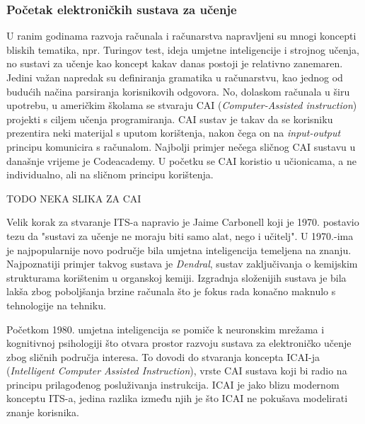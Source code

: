 \documentclass[times, utf8, zavrsni]{fer}
\begin{document}
\subsubsection{Početak elektroničkih sustava za učenje}
U ranim godinama razvoja računala i računarstva napravljeni su mnogi koncepti bliskih tematika, npr. Turingov test, ideja umjetne inteligencije i strojnog učenja, no sustavi za učenje kao koncept kakav danas postoji je relativno zanemaren. Jedini važan napredak su definiranja gramatika u računarstvu, kao jednog od budućih načina parsiranja korisnikovih odgovora. No, dolaskom računala u širu upotrebu, u američkim školama se stvaraju CAI (\textit{Computer-Assisted instruction}) projekti s ciljem učenja programiranja. CAI sustav je takav da se korisniku prezentira neki materijal s uputom korištenja, nakon čega on na \textit{input-output} principu komunicira s računalom. Najbolji primjer nečega sličnog CAI sustavu u današnje vrijeme je Codeacademy. U početku se CAI koristio u učionicama, a ne individualno, ali na sličnom principu korištenja.
\par TODO NEKA SLIKA ZA CAI
\par
Velik korak za stvaranje ITS-a napravio je Jaime Carbonell koji je 1970. postavio tezu da "sustavi za učenje ne moraju biti samo alat, nego i učitelj". U 1970.-ima je najpopularnije novo područje bila umjetna inteligencija temeljena na znanju. Najpoznatiji primjer takvog sustava je \textit{Dendral}, sustav zaključivanja o kemijskim strukturama korištenim u organskoj kemiji. Izgradnja složenijih sustava je bila lakša zbog poboljšanja brzine računala što je fokus rada konačno maknulo s tehnologije na tehniku. 
\par
Početkom 1980. umjetna inteligencija se pomiče k neuronskim mrežama i kognitivnoj psihologiji što otvara prostor razvoju sustava za elektroničko učenje zbog sličnih područja interesa. To dovodi do stvaranja koncepta ICAI-ja (\textit{Intelligent Computer Assisted Instruction}), vrste CAI sustava koji bi radio na principu prilagođenog posluživanja instrukcija. ICAI je jako blizu modernom konceptu ITS-a, jedina razlika između njih je što ICAI ne pokušava modelirati znanje korisnika.
\end{document}
